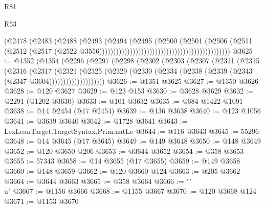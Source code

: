 \begin{lexlean}{R81}
\begin{lexlean}{R53}
\begin{coremodule}
{{{{{{{{{{{{{{{{{{{{{{{{{{{{{{{{{{{{{{{{{{{{{{{{{{{{{{{{{{{{{{{{{{{{{{{{{{{{{{{{{{{{{{{{{{{{{{{{{{{{{{{{{{{{{{{{                                                                        (@2478
                                                                          (@2483
                                                                            (@2488
                                                                              (@2493
                                                                                (@2494
                                                                                  (@2495
                                                                                    (@2500
                                                                                      (@2501
                                                                                        (@2506
                                                                                          (@2511
                                                                                            (@2512
                                                                                              (@2517
                                                                                                (@2522
                                                                                                  @3556)))))))))))))))))))))))))))))))))))))))))))))))
@3625 := @1352
    (@1354
      (@2296
        (@2297
          (@2298
            (@2302
              (@2303
                (@2307
                  (@2311
                    (@2315
                      (@2316
                        (@2317
                          (@2321
                            (@2325
                              (@2329
                                (@2330 (@2334 (@2338 (@2339 (@2343 (@2347 @3604))))))))))))))))))))
@3626 := @1351 @3625
@3627 := @1350 @3626
@3628 := @120 @3627
@3629 := @123 @153
@3630 := @3628 @3629
@3632 := @2291 (@1202 @3630)
@3633 := @101 @3632
@3635 := @684 @1422 @1091
@3638 := @14 @2454 (@17 @2454)
@3639 := @136 @3638
@3640 := @123 @1056
@3641 := @3639 @3640
@3642 := @1728 @3641
@3643 := LexLeanTarget.TargetSyntax.Prim.natLe
@3644 := @116 @3643
@3645 := 55296
@3648 := @14 @3645 (@17 @3645)
@3649 := @149 @3648
@3650 := @148 @3649
@3652 := @120 @3650 @206
@3653 := @3644 @3652
@3654 := @358 @3653
@3655 := 57343
@3658 := @14 @3655 (@17 @3655)
@3659 := @149 @3658
@3660 := @148 @3659
@3662 := @120 @3660 @124
@3663 := @205 @3662
@3664 := @3644 @3663
@3665 := @358 @3664
@3666 := "`\\u"
@3667 := @1156 @3666
@3668 := @1155 @3667
@3670 := @120 @3668 @124
@3671 := @1153 @3670
}}}}}}}}}}}}}}}}}}}}}}}}}}}}}}}}}}}}}}}}}}}}}}}}}}}}}}}}}}}}}}}}}}}}}}}}}}}}}}}}}}}}}}}}}}}}}}}}}}}}}}}}}}}}}}}}
\end{coremodule}
\end{lexlean}
\end{lexlean}
